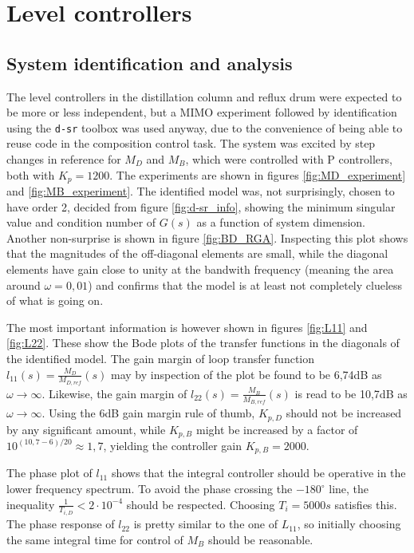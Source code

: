 \documentclass[12pt]{article}
\begin{document}


\newpage
\section{Level controllers}
\subsection{System identification and analysis}
The level controllers in the distillation column and reflux drum were expected to be more or less independent, but a MIMO experiment followed by identification using the \texttt{d-sr} toolbox was used anyway, due to the convenience of being able to reuse code in the composition control task. The system was excited by step changes in reference for $M_D$ and $M_B$, which were controlled with P controllers, both with $K_p = 1200$. The experiments are shown in figures \ref{fig:MD_experiment} and \ref{fig:MB_experiment}. The identified model was, not surprisingly, chosen to have order 2, decided from figure \ref{fig:d-sr_info}, showing the minimum singular value and condition number of $G(s)$ as a function of system dimension. Another non-surprise is shown in figure \ref{fig:BD_RGA}. Inspecting this plot shows that the magnitudes of the off-diagonal elements are small, while the diagonal elements have gain close to unity at the bandwith frequency (meaning the area around $\omega = 0,01$) and confirms that the model is at least not completely clueless of what is going on.

The most important information is however shown in figures \ref{fig:L11} and \ref{fig:L22}. These show the Bode plots of the transfer functions in the diagonals of the identified model. The gain margin of loop transfer function $l_{11}(s) = \frac{M_D}{M_{D, ref}}(s)$ may by inspection of the plot be found to be 6,74dB as $\omega \rightarrow \infty$. Likewise, the gain margin of $l_{22}(s) = \frac{M_B}{M_{B, ref}}(s)$ is read to be 10,7dB as $\omega \rightarrow \infty$. Using the 6dB gain margin rule of thumb, $K_{p, D}$ should not be increased by any significant amount, while $K_{p, B}$ might be increased by a factor of $10^{(10,7-6)/20} \approx 1,7$, yielding the controller gain $K_{p, B} = 2000$.

The phase plot of $l_{11}$ shows that the integral controller should be operative in the lower frequency spectrum. To avoid the phase crossing the $-180^\circ$ line, the inequality $\frac{1}{T_{i, D}} < 2 \cdot 10^{-4}$ should be respected. Choosing $T_i = 5000s$ satisfies this. The phase response of $l_{22}$ is pretty similar to the one of $L_{11}$, so initially choosing the same integral time for control of $M_B$ should be reasonable.
\end{document}

